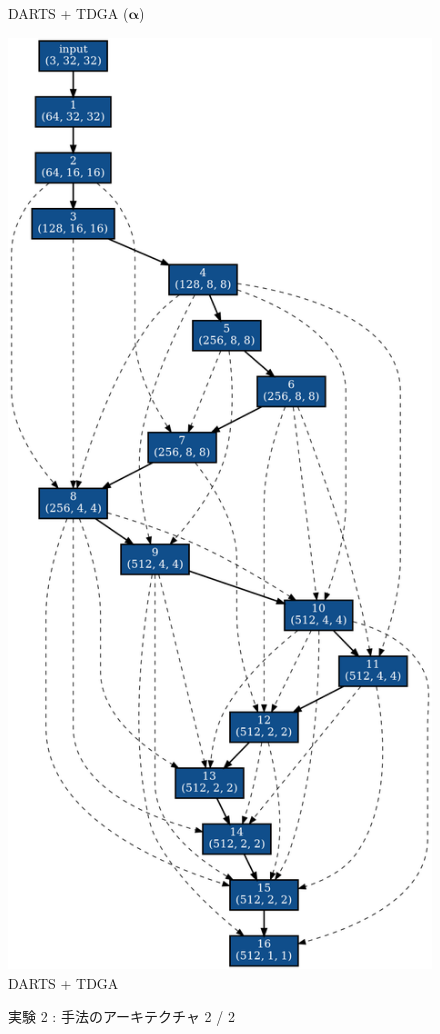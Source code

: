 \begin{figure}[tb]
\begin{minipage}{0.49\hsize}
\begin{center}
    DARTS + TDGA ($\bm{\alpha}$)
 	\end{center}
 \end{minipage}
 \begin{minipage}{0.49\hsize}
 	\begin{center}
    \includegraphics[clip,scale=0.19]{./fig/04.exp/noevo_last.png}\\
    DARTS + TDGA
 	\end{center}
 \end{minipage}
 \caption{実験 2 : 手法のアーキテクチャ 2 / 2}
 \label{fig:exp2/archi2}
\end{figure}

